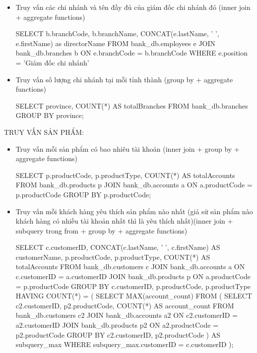 \begin{itemize}
    \item Truy vấn các chi nhánh và tên đầy đủ của giám đốc chi nhánh đó (inner join + aggregate functions)
    \begin{MySQLCode}
    SELECT 
	   b.branchCode,
        b.branchName,
        CONCAT(e.lastName, ' ', e.firstName) as directorName
    FROM 
        bank_db.employees e
    JOIN 
        bank_db.branches b ON e.branchCode = b.branchCode
    WHERE
    	e.position = 'Giám đốc chi nhánh'
    \end{MySQLCode}

    \item Truy vấn số lượng chi nhánh tại mỗi tỉnh thành (group by + aggregate functions)
    \begin{MySQLCode}
    SELECT 
	   province,
        COUNT(*) AS totalBranches
    FROM 
        bank_db.branches
    GROUP BY 
        province;
    \end{MySQLCode}

\end{itemize}
TRUY VẤN SẢN PHẨM:
\begin{itemize}

    \item Truy vấn mỗi sản phẩm có bao nhiêu tài khoản (inner join + group by + aggregate functions)
    \begin{MySQLCode}
    SELECT
	   p.productCode,
        p.productType,
        COUNT(*) AS totalAccounts
    FROM 
	   bank_db.products p
    JOIN
	   bank_db.accounts a ON a.productCode = p.productCode
    GROUP BY
	   p.productCode;
    \end{MySQLCode}

    \item Truy vấn mỗi khách hàng yêu thích sản phẩm nào nhất (giả sử sản phẩm nào khách hàng có nhiều tài khoản nhất thì là yêu thích nhất)(inner join + subquery trong from + group by + aggregate functions)
    \begin{MySQLCode}
    SELECT
        c.customerID,
        CONCAT(c.lastName, ' ', c.firstName) AS customerName,
        p.productCode,
        p.productType,
        COUNT(*) AS totalAccounts
    FROM
        bank_db.customers c
    JOIN 
        bank_db.accounts a ON c.customerID = a.customerID
    JOIN 
        bank_db.products p ON a.productCode = p.productCode
    GROUP BY
        c.customerID,
        p.productCode,
        p.productType
    HAVING
        COUNT(*) = (
            SELECT 
                MAX(account_count)
            FROM (
                SELECT 
                    c2.customerID,
                    p2.productCode,
                    COUNT(*) AS account_count
                FROM
                    bank_db.customers c2
                JOIN 
                    bank_db.accounts a2 ON c2.customerID = a2.customerID
                JOIN 
                    bank_db.products p2 ON a2.productCode = p2.productCode
                GROUP BY
                    c2.customerID,
                    p2.productCode
            ) AS subquery_max
            WHERE subquery_max.customerID = c.customerID
        );
    \end{MySQLCode}

\end{itemize}

    
    

    


